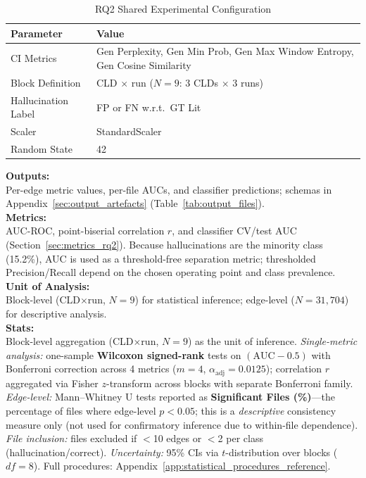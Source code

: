 \begin{table}[H]
\centering
\caption{RQ2 Shared Experimental Configuration}
\label{tab:rq2_shared_config}
\footnotesize
\begin{tabular}{@{}ll@{}}
\toprule
\textbf{Parameter} & \textbf{Value} \\
\midrule
CI Metrics & Gen Perplexity, Gen Min Prob, Gen Max Window Entropy, Gen Cosine Similarity \\
Block Definition & CLD $\times$ run ($N=9$: 3 CLDs $\times$ 3 runs) \\
Hallucination Label & FP or FN w.r.t.\ GT Lit \\
Scaler & StandardScaler \\
Random State & 42 \\
\bottomrule
\end{tabular}
\end{table}
\textbf{Outputs:}\\
Per-edge metric values, per-file AUCs, and classifier predictions; schemas in Appendix~\ref{sec:output_artefacts} (Table~\ref{tab:output_files}).\\
\textbf{Metrics:}\\
AUC-ROC, point-biserial correlation $r$, and classifier CV/test AUC (Section~\ref{sec:metrics_rq2}). Because hallucinations are the minority class (15.2\%), AUC is used as a threshold-free separation metric; thresholded Precision/Recall depend on the chosen operating point and class prevalence.\\
\textbf{Unit of Analysis:}\\
Block-level (CLD$\times$run, $N=9$) for statistical inference; edge-level ($N=31{,}704$) for descriptive analysis.\\
\textbf{Stats:}\\
Block-level aggregation (CLD$\times$run, $N{=}9$) as the unit of inference. \textit{Single-metric analysis:} one-sample \textbf{Wilcoxon signed-rank} tests on $(\mathrm{AUC}-0.5)$ with Bonferroni correction across 4 metrics ($m{=}4$, $\alpha_{\text{adj}}{=}0.0125$); correlation $r$ aggregated via Fisher $z$-transform across blocks with separate Bonferroni family. \textit{Edge-level:} Mann--Whitney U tests reported as \textbf{Significant Files (\%)}---the percentage of files where edge-level $p<0.05$; this is a \textit{descriptive} consistency measure only (not used for confirmatory inference due to within-file dependence). \textit{File inclusion:} files excluded if $<$10 edges or $<$2 per class (hallucination/correct). \textit{Uncertainty:} 95\% CIs via $t$-distribution over blocks ($df{=}8$). Full procedures: Appendix~\ref{app:statistical_procedures_reference}.\\
